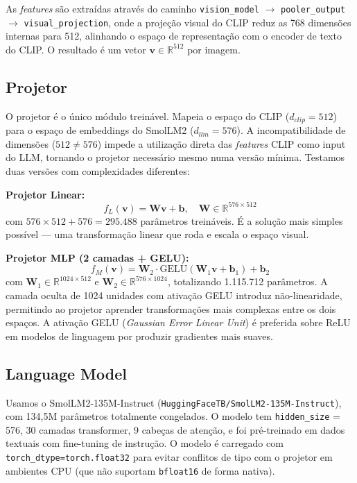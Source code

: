 \documentclass[conference]{IEEEtran}
\begin{document}
As \textit{features} são extraídas através do caminho \texttt{vision\_model} $\rightarrow$ \texttt{pooler\_output} $\rightarrow$ \texttt{visual\_projection}, onde a projeção visual do CLIP reduz as 768 dimensões internas para 512, alinhando o espaço de representação com o encoder de texto do CLIP. O resultado é um vetor $\mathbf{v} \in \mathbb{R}^{512}$ por imagem.

\subsection{Projetor}

O projetor é o único módulo treinável. Mapeia o espaço do CLIP ($d_{clip} = 512$) para o espaço de embeddings do SmolLM2 ($d_{llm} = 576$). A incompatibilidade de dimensões ($512 \neq 576$) impede a utilização direta das \textit{features} CLIP como input do LLM, tornando o projetor necessário mesmo numa versão mínima. Testamos duas versões com complexidades diferentes:

\textbf{Projetor Linear:}
\begin{equation}
    f_L(\mathbf{v}) = \mathbf{W}\mathbf{v} + \mathbf{b}, \quad \mathbf{W} \in \mathbb{R}^{576 \times 512}
\end{equation}
com $576 \times 512 + 576 = 295.488$ parâmetros treináveis. É a solução mais simples possível --- uma transformação linear que roda e escala o espaço visual.

\textbf{Projetor MLP (2 camadas + GELU):}
\begin{equation}
    f_M(\mathbf{v}) = \mathbf{W}_2 \cdot \text{GELU}(\mathbf{W}_1\mathbf{v} + \mathbf{b}_1) + \mathbf{b}_2
\end{equation}
com $\mathbf{W}_1 \in \mathbb{R}^{1024 \times 512}$ e $\mathbf{W}_2 \in \mathbb{R}^{576 \times 1024}$, totalizando 1.115.712 parâmetros. A camada oculta de 1024 unidades com ativação GELU introduz não-linearidade, permitindo ao projetor aprender transformações mais complexas entre os dois espaços. A ativação GELU (\textit{Gaussian Error Linear Unit}) é preferida sobre ReLU em modelos de linguagem por produzir gradientes mais suaves.

\subsection{Language Model}

Usamos o SmolLM2-135M-Instruct (\texttt{HuggingFaceTB/SmolLM2-135M-Instruct}), com 134,5M parâmetros totalmente congelados. O modelo tem \texttt{hidden\_size} = 576, 30 camadas transformer, 9 cabeças de atenção, e foi pré-treinado em dados textuais com fine-tuning de instrução. O modelo é carregado com \texttt{torch\_dtype=torch.float32} para evitar conflitos de tipo com o projetor em ambientes CPU (que não suportam \texttt{bfloat16} de forma nativa).
\end{document}
